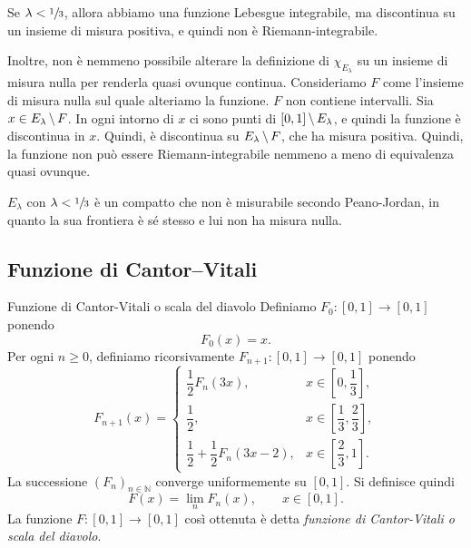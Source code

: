 \documentclass[a4paper]{article}
\begin{document}
\begin{radioactive}
Se \(\lambda < \sfrac13\), allora abbiamo una funzione Lebesgue integrabile,
ma discontinua su un insieme di misura positiva,
e quindi non è Riemann-integrabile.
\end{radioactive}

\begin{radioactive}
Inoltre, non è nemmeno possibile alterare la definizione di \(\chi_{E_\lambda}\)
su un insieme di misura nulla per renderla quasi ovunque continua.
Consideriamo \(F\) come l'insieme di misura nulla sul quale alteriamo la funzione.
\(F\) non contiene intervalli. Sia \(x \in E_\lambda \,\backslash\, F\).
In ogni intorno di \(x\) ci sono punti di \([0,1] \,\backslash\, E_\lambda\),
e quindi la funzione è discontinua in \(x\).
Quindi, è discontinua su \(E_\lambda \,\backslash\, F\), che ha misura positiva.
Quindi, la funzione non può essere Riemann-integrabile nemmeno a meno di equivalenza
quasi ovunque.
\end{radioactive}

\begin{radioactive}
\(E_\lambda\) con \(\lambda < \sfrac13\) è un compatto che non è misurabile secondo Peano-Jordan,
in quanto la sua frontiera è sé stesso e lui non ha misura nulla.
\end{radioactive}

\subsection{Funzione di Cantor--Vitali}

\begin{radioactive}
\begin{snippetdefinition}{Funzione di Cantor-Vitali o scala del diavolo}
    Definiamo \(F_0:[0,1]\to[0,1]\) ponendo
    \[
        F_0(x)=x.
    \]
    Per ogni \(n\geq 0\), definiamo ricorsivamente \(F_{n+1}:[0,1]\to[0,1]\) ponendo
    \[
        F_{n+1}(x)=
        \begin{cases}
            \dfrac{1}{2}F_n(3x), & x\in\left[0,\dfrac{1}{3}\right], \\[1.2em]
            \dfrac{1}{2}, & x\in\left[\dfrac{1}{3},\dfrac{2}{3}\right], \\[1.2em]
            \dfrac{1}{2}+\dfrac{1}{2}F_n(3x-2), & x\in\left[\dfrac{2}{3},1\right].
        \end{cases}
    \]
    La successione \((F_n)_{n\in\mathbb{N}}\) converge uniformemente su \([0,1]\). Si definisce quindi
    \[
        F(x)=\lim_{n}F_n(x),
        \qquad x\in[0,1].
    \]
    La funzione \(F:[0,1]\to[0,1]\) così ottenuta
    è detta \emph{funzione di Cantor-Vitali o scala del diavolo}.
\end{snippetdefinition}
\end{radioactive}
\end{document}
